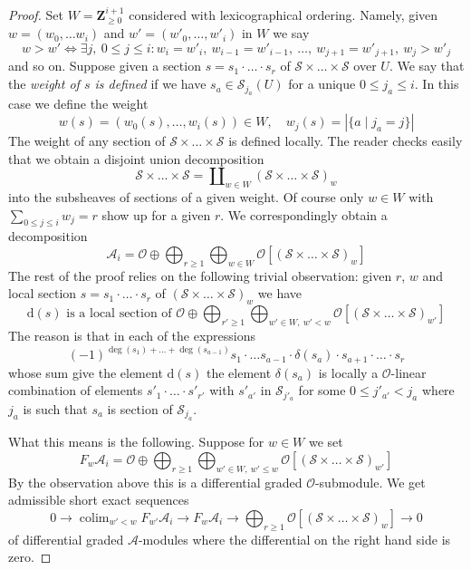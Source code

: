 \documentclass{stacks-project}
\theoremstyle{plain}
\theoremstyle{definition}
\theoremstyle{remark}
\numberwithin{equation}{subsection}
\def\colim{\mathop{\mathrm{colim}}\nolimits}
\begin{document}
\begin{proof}
\medskip\noindent
Set $W = \mathbf{Z}_{\geq 0}^{i + 1}$ considered with lexicographical
ordering. Namely, given $w = (w_0, \ldots w_i)$ and
$w' = (w'_0, \ldots, w'_i)$ in $W$ we say
$$
w > w' \Leftrightarrow
\exists j,\ 0 \leq j \leq i :
w_i = w'_i,\ w_{i - 1} = w'_{i - 1},\ \ldots ,
\ w_{j + 1} = w'_{j + 1},\ w_j > w'_j
$$
and so on. Suppose given a section
$s = s_1 \cdot \ldots \cdot s_r$ of
$\mathcal{S} \times \ldots \times \mathcal{S}$
over $U$. We say that the {\it weight of $s$ is defined}
if we have $s_a \in \mathcal{S}_{j_a}(U)$ for a unique
$0 \leq j_a \leq i$. In this case we define the weight
$$
w(s) = (w_0(s), \ldots, w_i(s)) \in W,\quad
w_j(s) = |\{a \mid j_a = j\}|
$$
The weight of any section of $\mathcal{S} \times \ldots \times \mathcal{S}$
is defined locally. The reader checks easily that we obtain a disjoint union
decomposition
$$
\mathcal{S} \times \ldots \times \mathcal{S} =
\coprod\nolimits_{w \in W} \left(
\mathcal{S} \times \ldots \times \mathcal{S}\right)_w
$$
into the subsheaves of sections of a given weight. Of course
only $w \in W$ with $\sum_{0 \leq j \leq i} w_j = r$ show up for a given $r$.
We correspondingly obtain a decomposition
$$
\mathcal{A}_i = \mathcal{O} \oplus
\bigoplus\nolimits_{r \geq 1}
\bigoplus\nolimits_{w \in W}
\mathcal{O}[\left(\mathcal{S} \times \ldots \times \mathcal{S}\right)_w]
$$
The rest of the proof relies on the following trivial observation:
given $r$, $w$ and local section $s = s_1 \cdot \ldots \cdot s_r$ of
$\left(\mathcal{S} \times \ldots \times \mathcal{S}\right)_w$
we have
$$
\text{d}(s) \text{ is a local section of } \mathcal{O} \oplus
\bigoplus\nolimits_{r' \geq 1}
\bigoplus\nolimits_{w' \in W,\ w' < w}
\mathcal{O}[\left(\mathcal{S} \times \ldots \times \mathcal{S}\right)_{w'}]
$$
The reason is that in each of the expressions
$$
(-1)^{\deg(s_1) + \ldots + \deg(s_{a - 1})}
s_1 \cdot \ldots s_{a - 1} \cdot \delta(s_a) \cdot
s_{a + 1} \cdot \ldots \cdot s_r
$$
whose sum give the element $\text{d}(s)$ the element $\delta(s_a)$
is locally a $\mathcal{O}$-linear combination of elements
$s'_1 \cdot \ldots \cdot s'_{r'}$ with $s'_{a'}$ in
$\mathcal{S}_{j'_a}$ for some $0 \leq j'_{a'} < j_a$ where $j_a$ is such that
$s_a$ is section of $\mathcal{S}_{j_a}$.

\medskip\noindent
What this means is the following. Suppose for $w \in W$ we set
$$
F_w \mathcal{A}_i = \mathcal{O} \oplus \bigoplus\nolimits_{r \geq 1}
\bigoplus\nolimits_{w' \in W,\ w' \leq w}
\mathcal{O}[\left(\mathcal{S} \times \ldots \times \mathcal{S}\right)_{w'}]
$$
By the observation above this is a differential graded $\mathcal{O}$-submodule.
We get admissible short exact sequences
$$
0 \to \colim_{w' < w} F_{w'}\mathcal{A}_i \to
F_w\mathcal{A}_i \to
\bigoplus\nolimits_{r \geq 1}
\mathcal{O}[\left(\mathcal{S} \times \ldots \times \mathcal{S}\right)_w]
\to 0
$$
of differential graded $\mathcal{A}$-modules where the differential
on the right hand side is zero.


\end{proof}
\end{document}
